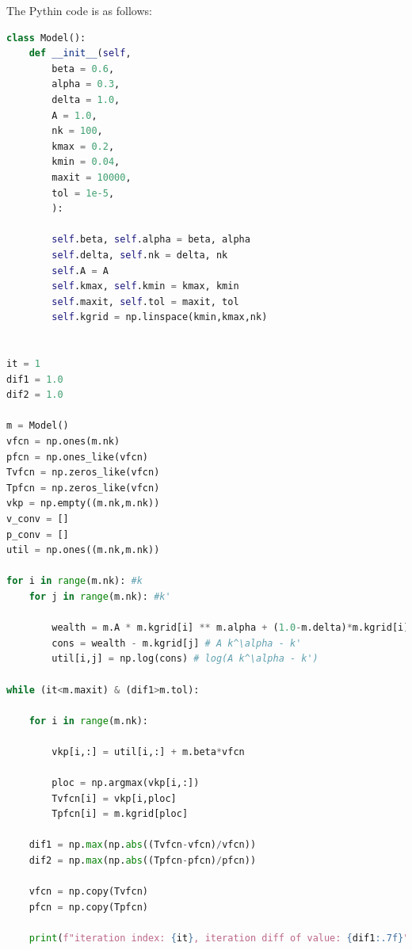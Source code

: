 \documentclass{ltjsarticle}
\begin{document}
The Pythin code is as follows:
\begin{lstlisting}[language=python,
    backgroundcolor=\color{backcolour},
    commentstyle=\color{codegreen},
    morekeywords={as},
    classoffset=0,
    keywordstyle=\color{codepurple},
    deletekeywords={list,in,float},
    classoffset=1,
    morekeywords={list},
    keywordstyle=\color{blue!60!green},
    classoffset=2,
    morekeywords={in},
    keywordstyle=\color{blue},
    classoffset=3,
    morekeywords={float},
    keywordstyle=\color{blue!40!green},
    numberstyle=\tiny\color{black},
    stringstyle=\color{codered},
    basicstyle=\ttfamily\footnotesize,
    breaklines=true,
    emph={len,range,print},
    emphstyle=\color{yellow!40!black}
    ]
class Model():
    def __init__(self,
        beta = 0.6,
        alpha = 0.3,  
        delta = 1.0, 
        A = 1.0,     
        nk = 100,   
        kmax = 0.2,  
        kmin = 0.04, 
        maxit = 10000, 
        tol = 1e-5,
        ): 
        
        self.beta, self.alpha = beta, alpha 
        self.delta, self.nk = delta, nk 
        self.A = A
        self.kmax, self.kmin = kmax, kmin 
        self.maxit, self.tol = maxit, tol
        self.kgrid = np.linspace(kmin,kmax,nk)


it = 1 
dif1 = 1.0 
dif2 = 1.0 

m = Model()
vfcn = np.ones(m.nk)
pfcn = np.ones_like(vfcn)
Tvfcn = np.zeros_like(vfcn)
Tpfcn = np.zeros_like(vfcn)
vkp = np.empty((m.nk,m.nk))
v_conv = [] 
p_conv = [] 
util = np.ones((m.nk,m.nk))

for i in range(m.nk): #k
    for j in range(m.nk): #k'
        
        wealth = m.A * m.kgrid[i] ** m.alpha + (1.0-m.delta)*m.kgrid[i] #A k^\alpha
        cons = wealth - m.kgrid[j] # A k^\alpha - k'
        util[i,j] = np.log(cons) # log(A k^\alpha - k')

while (it<m.maxit) & (dif1>m.tol):

    for i in range(m.nk):
        
        vkp[i,:] = util[i,:] + m.beta*vfcn
        
        ploc = np.argmax(vkp[i,:])
        Tvfcn[i] = vkp[i,ploc]
        Tpfcn[i] = m.kgrid[ploc]
    
    dif1 = np.max(np.abs((Tvfcn-vfcn)/vfcn))
    dif2 = np.max(np.abs((Tpfcn-pfcn)/pfcn)) 
    
    vfcn = np.copy(Tvfcn)
    pfcn = np.copy(Tpfcn)

    print(f"iteration index: {it}, iteration diff of value: {dif1:.7f}")


\end{lstlisting}
\end{document}
